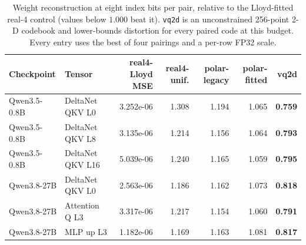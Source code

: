 \begin{table}[ht]
\centering\small
\setlength{\tabcolsep}{4pt}
\caption{Weight reconstruction at eight index bits per pair, relative to the Lloyd-fitted
real-4 control (values below $1.000$ beat it). \texttt{vq2d} is an unconstrained 256-point
2-D codebook and lower-bounds distortion for every paired code at this budget.
Every entry uses the best of four pairings and a per-row FP32 scale.}
\label{tab:ceiling}
\begin{tabular}{llrrrrr}\toprule
Checkpoint & Tensor & real4-Lloyd MSE & real4-unif. & polar-legacy & polar-fitted & vq2d\\\midrule
Qwen3.5-0.8B & DeltaNet QKV L0 & 3.252e-06 & 1.308 & 1.194 & 1.065 & \textbf{0.759}\\
Qwen3.5-0.8B & DeltaNet QKV L8 & 3.135e-06 & 1.214 & 1.156 & 1.064 & \textbf{0.793}\\
Qwen3.5-0.8B & DeltaNet QKV L16 & 5.039e-06 & 1.240 & 1.165 & 1.059 & \textbf{0.795}\\
Qwen3.8-27B & DeltaNet QKV L0 & 2.563e-06 & 1.186 & 1.162 & 1.073 & \textbf{0.818}\\
Qwen3.8-27B & Attention Q L3 & 3.317e-06 & 1.217 & 1.154 & 1.060 & \textbf{0.791}\\
Qwen3.8-27B & MLP up L3 & 1.182e-06 & 1.169 & 1.163 & 1.081 & \textbf{0.817}\\
\bottomrule
\end{tabular}
\end{table}
